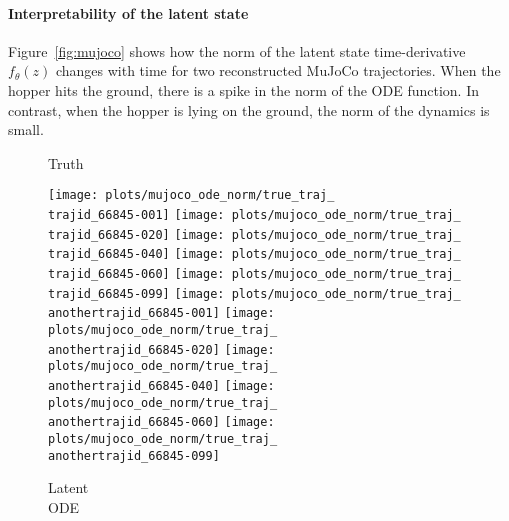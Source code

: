 \documentclass{article}
\begin{document}
\paragraph{Interpretability of the latent state}
Figure~\ref{fig:mujoco} shows how the norm of the latent state time-derivative $f_\theta(z)$ changes with time for two reconstructed MuJoCo trajectories.
When the hopper hits the ground, there is a spike in the norm of the ODE function.
In contrast, when the hopper is lying on the ground, the norm of the dynamics is small. 


\newcommand{\nfwidth}{0.09\textwidth}\newcommand{\trajid}{9}\newcommand{\anothertrajid}{5}\begin{figure*}[b]
\begin{subfigure}[b]{0.07\linewidth}
	    \small
		Truth
		\vspace{3mm}
	\end{subfigure}
\begin{subfigure}[b]{0.9\linewidth}
		\centering
		\texttt{[image: plots/mujoco\_ode\_norm/true\_traj\_\\trajid\_66845-001]}
		\texttt{[image: plots/mujoco\_ode\_norm/true\_traj\_\\trajid\_66845-020]}
		\texttt{[image: plots/mujoco\_ode\_norm/true\_traj\_\\trajid\_66845-040]}
		\texttt{[image: plots/mujoco\_ode\_norm/true\_traj\_\\trajid\_66845-060]}
		\texttt{[image: plots/mujoco\_ode\_norm/true\_traj\_\\trajid\_66845-099]}
		\hfill
		\texttt{[image: plots/mujoco\_ode\_norm/true\_traj\_\\anothertrajid\_66845-001]}
		\texttt{[image: plots/mujoco\_ode\_norm/true\_traj\_\\anothertrajid\_66845-020]}
		\texttt{[image: plots/mujoco\_ode\_norm/true\_traj\_\\anothertrajid\_66845-040]}
		\texttt{[image: plots/mujoco\_ode\_norm/true\_traj\_\\anothertrajid\_66845-060]}
		\texttt{[image: plots/mujoco\_ode\_norm/true\_traj\_\\anothertrajid\_66845-099]}
	\end{subfigure}
\begin{subfigure}[b]{0.07\linewidth}
		\small
    	 Latent\\ODE
    	 \vspace{2mm}
	\end{subfigure}

\end{figure*}
\end{document}
